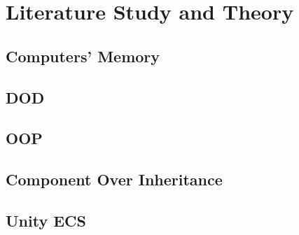 \chapter{Literature Study and Theory}
\label{chap:lr}


\Blindtext[2]

\section{Computers' Memory}
\Blindtext[1]
\section{DOD}
\Blindtext[1]
\section{OOP}
\Blindtext[1]
\section{Component Over Inheritance}
\Blindtext[1]
\section{Unity ECS}
\Blindtext[1]
